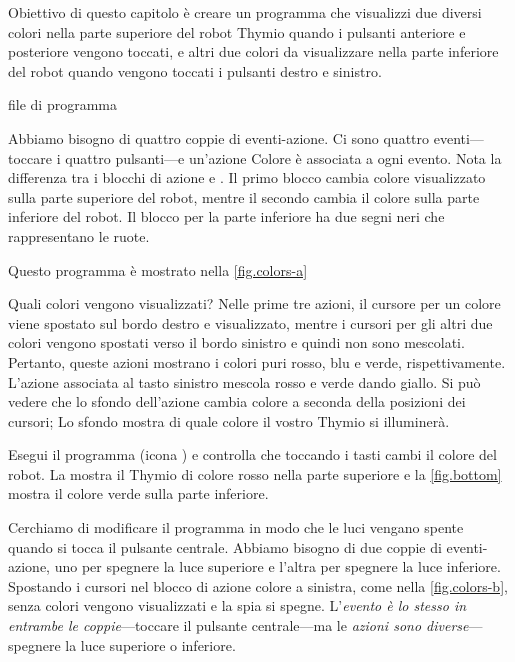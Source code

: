 
\label{ch.colors}


Obiettivo di questo capitolo è creare un programma che visualizzi due diversi colori nella parte superiore del robot Thymio quando i pulsanti anteriore e posteriore vengono toccati, e altri due colori da visualizzare nella parte inferiore del robot
quando vengono toccati i pulsanti destro e sinistro.

{\raggedleft \hfill file di programma }

Abbiamo bisogno di quattro coppie di eventi-azione.
Ci sono quattro eventi---toccare i
quattro pulsanti---e un'azione Colore è associata a ogni evento. Nota la
differenza tra i blocchi di azione  e
. Il primo blocco cambia colore
visualizzato sulla parte superiore del robot, mentre il secondo cambia il colore sulla
parte inferiore del robot. Il blocco per la parte inferiore ha due segni neri
che rappresentano le ruote.

Questo programma è mostrato nella \cref{fig.colors-a}

Quali colori vengono visualizzati? Nelle prime tre azioni, il cursore per
un colore viene spostato sul bordo destro e visualizzato, mentre i cursori
per gli altri due colori vengono spostati verso il bordo sinistro e quindi non sono mescolati. Pertanto, queste azioni mostrano i colori puri rosso, blu e verde,
rispettivamente. L'azione associata al tasto sinistro mescola rosso e verde
dando giallo.
Si può vedere che lo sfondo dell'azione cambia colore a seconda della
posizioni dei cursori; Lo sfondo mostra di quale colore il vostro Thymio si illuminerà.

Esegui il programma (icona ) e controlla che toccando i tasti cambi il colore del robot.
La  mostra il Thymio di colore rosso
nella parte superiore e la \cref{fig.bottom} mostra il colore verde sulla parte
inferiore.




Cerchiamo di modificare il programma in modo che le luci vengano spente quando si tocca il
pulsante centrale. Abbiamo bisogno di due coppie di eventi-azione, uno per spegnere la luce superiore e l'altra per spegnere la luce inferiore.
Spostando i cursori nel blocco di azione colore a sinistra, come nella \cref{fig.colors-b}, senza colori vengono visualizzati e la spia si spegne.
L'\emph{evento è lo stesso in entrambe le coppie}---toccare il pulsante centrale---ma
le \emph{azioni sono diverse}---spegnere la luce superiore o inferiore.

